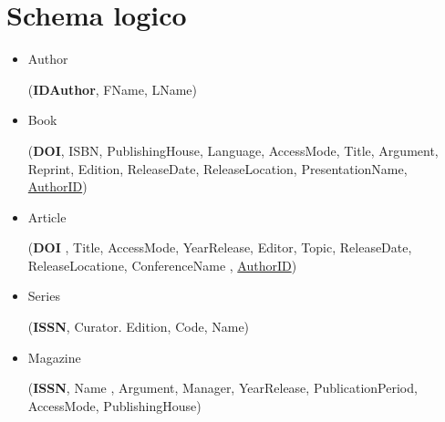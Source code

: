 \chapter{Schema logico}
																			
\begin{itemize}


\item Author


(\textbf{IDAuthor}, FName, LName)




\item Book


(\textbf{DOI}, ISBN, PublishingHouse, Language, AccessMode, Title, Argument, Reprint, Edition, ReleaseDate, ReleaseLocation, PresentationName, \underline{AuthorID})


\item Article

(\textbf{DOI} , Title, AccessMode, YearRelease, Editor, Topic, ReleaseDate, ReleaseLocatione, ConferenceName , \underline{AuthorID})



\item Series


(\textbf{ISSN}, Curator. Edition, Code, Name)



\item Magazine


(\textbf{ISSN}, Name , Argument, Manager, YearRelease, PublicationPeriod, AccessMode,
PublishingHouse)



\end{itemize}
